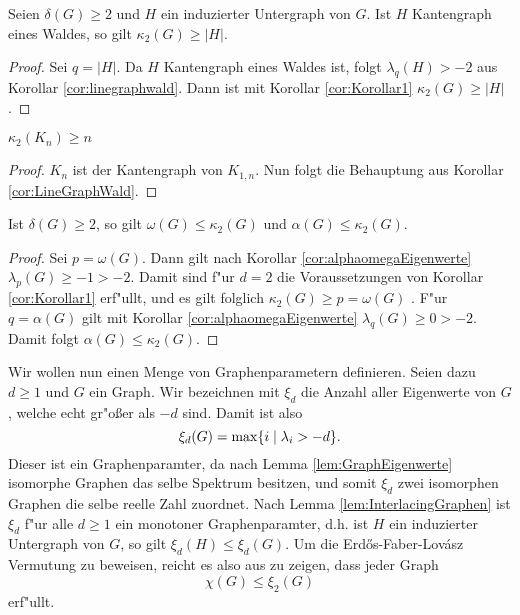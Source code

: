 \begin{corollary}
  \label{cor:LineGraphWald}
  Seien $\delta(G) \geq 2$ und $H$ ein induzierter Untergraph von $G$. Ist $H$ Kantengraph eines Waldes, so gilt 
  $\kappa_{2}(G)\geq \left|H\right|$.
\end{corollary}

\begin{proof}
  Sei $q = |H|$. Da $H$ Kantengraph eines Waldes ist, folgt $\lambda_{q}(H) > -2$ aus Korollar \ref{cor:linegraphwald}.
  Dann ist mit Korollar \ref{cor:Korollar1} $\kappa_{2}\left( G \right) \geq \left| H\right|$.
\end{proof}

\begin{corollary}[Klotz]
  $\kappa_{2}\left( K_n \right) \geq n$
\end{corollary}

\begin{proof}
  $K_n$ ist der Kantengraph von $K_{1,n}$. Nun folgt die Behauptung aus Korollar \ref{cor:LineGraphWald}.
\end{proof}
\begin{corollary}
  Ist $\delta\left( G \right) \geq 2$, so gilt $\omega\left( G \right)\leq \kappa_{2}\left( G \right)$ und $\alpha\left( G \right)\leq \kappa_{2}\left( G \right)$.
  \label{cor:alphaomegakrausz}
\end{corollary}

\begin{proof}
  Sei $p = \omega(G)$. Dann gilt nach Korollar \ref{cor:alphaomegaEigenwerte} $\lambda_{p}\left( G \right)\geq -1 > -2$. Damit sind f"ur $d=2$ die Voraussetzungen von Korollar \ref{cor:Korollar1} erf"ullt, und es gilt folglich $\kappa_{2}\left( G \right)\geq p = \omega\left( G \right)$ .
  F"ur $q=\alpha\left( G \right)$ gilt mit Korollar \ref{cor:alphaomegaEigenwerte} $\lambda_{q}\left( G \right)\geq 0 > -2$. Damit folgt $\alpha\left( G \right) \leq \kappa_{2}\left( G \right)$.
\end{proof}

Wir wollen nun einen Menge von Graphenparametern definieren. Seien dazu $d\geq 1$ und $G$ ein Graph. Wir bezeichnen mit $\xi_{d}$ die Anzahl aller Eigenwerte von $G$, welche echt gr"o{\ss}er als $-d$ sind. Damit ist also 
$$\xi_{d}(G) = \max \{i \;|\; \lambda_i > -d \}.$$
Dieser ist ein Graphenparamter, da nach Lemma \ref{lem:GraphEigenwerte} isomorphe Graphen das selbe Spektrum besitzen, und somit $\xi_d $ zwei isomorphen Graphen die selbe reelle Zahl zuordnet. 
Nach Lemma \ref{lem:InterlacingGraphen} ist $\xi_{d}$ f"ur alle $d\geq 1$ ein monotoner Graphenparamter, d.h. ist $H$ ein induzierter Untergraph von $G$, so gilt $\xi_d(H) \leq \xi_d(G)$.
Um die Erd\H{o}s-Faber-Lov\'asz Vermutung zu beweisen, reicht es also aus zu zeigen, dass jeder Graph $$\chi(G) \leq \xi_{2}(G)$$ erf"ullt. 

